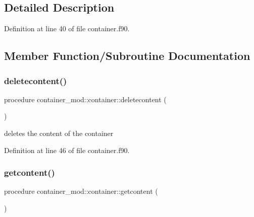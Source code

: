 \subsection{Detailed Description}


Definition at line 40 of file container.\+f90.



\subsection{Member Function/\+Subroutine Documentation}
\mbox{\label{structcontainer__mod_1_1container_a69d57b2b6fd0f7b337e438657df27653}} 
\subsubsection{\texorpdfstring{deletecontent()}{deletecontent()}}
{\footnotesize\ttfamily procedure container\+\_\+mod\+::container\+::deletecontent (\begin{DoxyParamCaption}{ }\end{DoxyParamCaption})\hspace{0.3cm}{\ttfamily [private]}}



deletes the content of the container 



Definition at line 46 of file container.\+f90.

\mbox{\label{structcontainer__mod_1_1container_abe1540dea98e715a935b91c662a2d81a}} 
\subsubsection{\texorpdfstring{getcontent()}{getcontent()}}
{\footnotesize\ttfamily procedure container\+\_\+mod\+::container\+::getcontent (\begin{DoxyParamCaption}{ }\end{DoxyParamCaption})\hspace{0.3cm}{\ttfamily [private]}}



